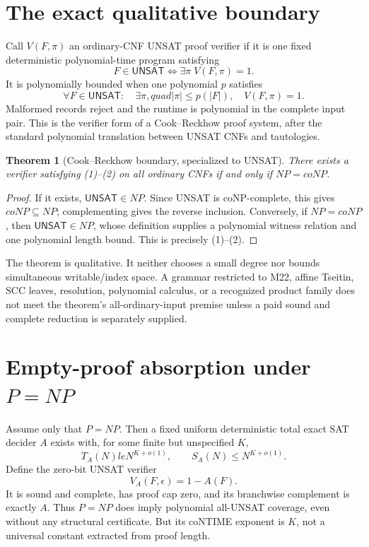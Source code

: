 \documentclass[11pt]{article}
\newtheorem{theorem}{Theorem}
\newcommand{\UNSAT}{\mathsf{UNSAT}}
\begin{document}
\section{The exact qualitative boundary}
Call $V(F,\pi)$ an ordinary-CNF UNSAT proof verifier if it is one fixed
deterministic polynomial-time program satisfying
\[
 F\in\UNSAT\iff\exists\pi\;V(F,\pi)=1.                         \tag{1}
\]
It is polynomially bounded when one polynomial $p$ satisfies
\[
 \forall F\in\UNSAT:\quad\exists\pi,quad |\pi|\le p(|F|),
 \quad V(F,\pi)=1.                                             \tag{2}
\]
Malformed records reject and the runtime is polynomial in the complete
input pair.  This is the verifier form of a Cook--Reckhow proof system,
after the standard polynomial translation between UNSAT CNFs and tautologies.

\begin{theorem}[Cook--Reckhow boundary, specialized to UNSAT]
There exists a verifier satisfying (1)--(2) on all ordinary CNFs if and only
if $NP=coNP$.
\end{theorem}
\begin{proof}
If it exists, $\UNSAT\in NP$.  Since UNSAT is coNP-complete, this gives
$coNP\subseteq NP$; complementing gives the reverse inclusion.  Conversely,
if $NP=coNP$, then $\UNSAT\in NP$, whose definition supplies a polynomial
witness relation and one polynomial length bound.  This is precisely
(1)--(2).
\end{proof}

The theorem is qualitative.  It neither chooses a small degree nor bounds
simultaneous writable/index space.  A grammar restricted to M22, affine
Tseitin, SCC leaves, resolution, polynomial calculus, or a recognized
product family does not meet the theorem's all-ordinary-input premise unless
a paid sound and complete reduction is separately supplied.

\section{Empty-proof absorption under $P=NP$}
Assume only that $P=NP$.  Then a fixed uniform deterministic total exact SAT
decider $A$ exists with, for some finite but unspecified $K$,
\[
 T_A(N)le N^{K+o(1)},\qquad S_A(N)\le N^{K+o(1)}.               \tag{3}
\]
Define the zero-bit UNSAT verifier
\[
             V_A(F,\epsilon)=1-A(F).                            \tag{4}
\]
It is sound and complete, has proof cap zero, and its branchwise complement
is exactly $A$.  Thus $P=NP$ does imply polynomial all-UNSAT coverage, even
without any structural certificate.  But its coNTIME exponent is $K$, not a
universal constant extracted from proof length.
\end{document}
